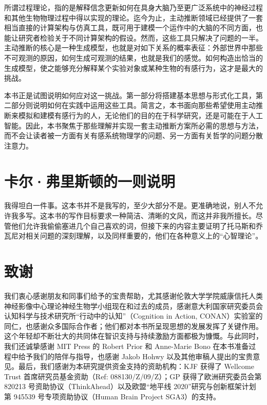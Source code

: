 所谓过程理论，指的是解释信念更新如何在具身大脑乃至更广泛系统中的神经过程和其他生物物理过程中得以实现的理论。迄今为止，主动推断领域已经提供了一套相当直接的计算架构与仿真工具，既可用于建模一个运作中的大脑的不同方面，也能让研究者检验关于不同计算架构的假设。然而，这些工具只解决了问题的一半。主动推断的核心是一种生成模型，也就是对如下关系的概率表征：外部世界中那些不可观测的原因，如何生成可观测的结果，也就是我们的感觉。如何构造出恰当的生成模型，使之能够充分解释某个实验对象或某种生物的有感行为，这才是最大的挑战。

本书正是试图说明如何应对这一挑战。第一部分将搭建基本思想与形式化工具，第二部分则说明如何在实践中运用这些工具。简言之，本书面向那些希望使用主动推断来模拟和建模有感行为的人，无论他们的目的在于科学研究，还是可能在于人工智能。因此，本书聚焦于那些理解并实现一套主动推断方案所必需的思想与方法，而不会让读者被一方面有关有感系统物理学的问题、另一方面有关哲学的问题分散注意力。

\section*{卡尔·弗里斯顿的一则说明}

我得坦白一件事。这本书并不是我写的，至少大部分不是。更准确地说，别人不允许我多写。这本书的写作目标要求一种简洁、清晰的文风，而这并非我所擅长。尽管他们允许我偷偷塞进几个自己喜欢的词，但接下来的内容主要证明了托马斯和乔瓦尼对相关问题的深刻理解，以及同样重要的，他们在各种意义上的“心智理论”。

\section*{致谢}

我们衷心感谢朋友和同事们给予的宝贵帮助，尤其感谢伦敦大学学院威康信托人类神经影像中心理论神经生物学小组现在和过去的成员，感谢意大利国家研究委员会认知科学与技术研究所“行动中的认知”（Cognition in Action, CONAN）实验室的同仁，也感谢众多国际合作者；他们都对本书所呈现思想的发展发挥了关键作用。这个年轻却不断壮大的共同体在智识支持与持续激励方面都极为慷慨。与此同时，我们还诚挚感谢 MIT Press 的 Robert Prior 和 Anne-Marie Bono 在本书准备过程中给予我们的陪伴与指导，也感谢 Jakob Hohwy 以及其他审稿人提出的宝贵意见。最后，我们感谢为本研究提供资金支持的资助机构：KJF 获得了 Wellcome Trust 首席研究员基金资助（Ref: 088130/Z/09/Z）；GP 获得了欧洲研究委员会第 820213 号资助协议（ThinkAhead）以及欧盟“地平线 2020”研究与创新框架计划第 945539 号专项资助协议（Human Brain Project SGA3）的支持。

